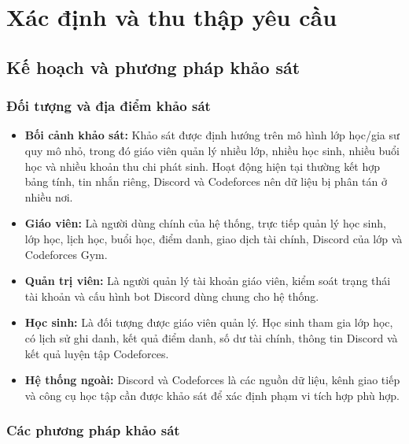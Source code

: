 \documentclass[12pt,a4paper]{article}
\begin{document}
\section{Xác định và thu thập yêu cầu}

\subsection{Kế hoạch và phương pháp khảo sát}

\subsubsection{Đối tượng và địa điểm khảo sát}

\begin{itemize}[leftmargin=*]
    \item \textbf{Bối cảnh khảo sát:} Khảo sát được định hướng trên mô hình lớp
    học/gia sư quy mô nhỏ, trong đó giáo viên quản lý nhiều lớp, nhiều học sinh,
    nhiều buổi học và nhiều khoản thu chi phát sinh. Hoạt động hiện tại thường
    kết hợp bảng tính, tin nhắn riêng, Discord và Codeforces nên dữ liệu bị phân
    tán ở nhiều nơi.

    \item \textbf{Giáo viên:} Là người dùng chính của hệ thống, trực tiếp quản lý
    học sinh, lớp học, lịch học, buổi học, điểm danh, giao dịch tài chính, Discord
    của lớp và Codeforces Gym.

    \item \textbf{Quản trị viên:} Là người quản lý tài khoản giáo viên, kiểm soát
    trạng thái tài khoản và cấu hình bot Discord dùng chung cho hệ thống.

    \item \textbf{Học sinh:} Là đối tượng được giáo viên quản lý. Học sinh tham
    gia lớp học, có lịch sử ghi danh, kết quả điểm danh, số dư tài chính, thông
    tin Discord và kết quả luyện tập Codeforces.

    \item \textbf{Hệ thống ngoài:} Discord và Codeforces là các nguồn dữ liệu,
    kênh giao tiếp và công cụ học tập cần được khảo sát để xác định phạm vi tích
    hợp phù hợp.
\end{itemize}

\subsubsection{Các phương pháp khảo sát}
\end{document}
